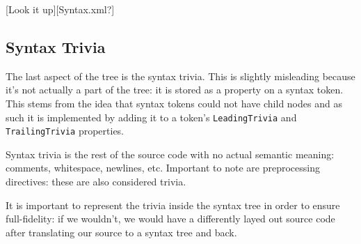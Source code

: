 [Look it up][Syntax.xml?]

\subsection{Syntax Trivia}
\label{sec:syntax-trivia}

The last aspect of the tree is the syntax trivia. This is slightly misleading because it's not actually a part of the tree: it is stored as a property on a syntax token. This stems from the idea that syntax tokens could not have child nodes and as such it is implemented by adding it to a token's \verb|LeadingTrivia| and \verb|TrailingTrivia| properties. 

Syntax trivia is the rest of the source code with no actual semantic meaning: comments, whitespace, newlines, etc. Important to note are preprocessing directives: these are also considered trivia.

It is important to represent the trivia inside the syntax tree in order to ensure full-fidelity: if we wouldn't, we would have a differently layed out source code after translating our source to a syntax tree and back.




